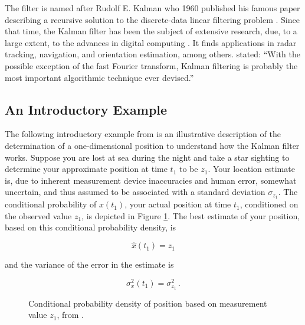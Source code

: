 The filter is named after Rudolf E. Kalman who 1960 published his famous paper describing a recursive solution to the discrete-data linear filtering problem \cite{kalman_1960}. Since that time, the Kalman filter has been the subject of extensive research, due, to a large extent, to the advances in digital computing \cite{welch2014}. It finds applications in radar tracking, navigation, and orientation estimation, among others. \citeauthor{zarchan2009fundamentals} \cite{zarchan2009fundamentals} stated: ``With the possible exception of the fast Fourier transform, Kalman filtering is probably the most important algorithmic technique ever devised.''

\subsection{An Introductory Example}

The following introductory example from \citeauthor{Maybeck79} \cite{Maybeck79} is an illustrative description of the determination of a one-dimensional position to understand how the Kalman filter works. Suppose you are lost at sea during the night and take a star sighting to determine your approximate position at time $t_1$ to be $z_1$. Your location estimate is, due to inherent measurement device inaccuracies and human error, somewhat uncertain, and thus assumed to be associated with a standard deviation $\sigma_{z_1}$. The conditional probability of $x(t_1)$, your actual position at time $t_1$, conditioned on the observed value $z_1$, is depicted in Figure \ref{fig:measurement_z1}. The best estimate of your position, based on this conditional probability density, is

\begin{equation}
  \hat{x}(t_1)=z_1
\end{equation}

\noindent
and the variance of the error in the estimate is

\begin{equation}
  \sigma^2_x(t_1)=\sigma^2_{z_1}\,.
\end{equation}

\begin{figure}
\centering
{}
\caption{Conditional probability density of position based on measurement value $z_1$, from \cite{Maybeck79}.} \label{fig:measurement_z1}
\end{figure}

